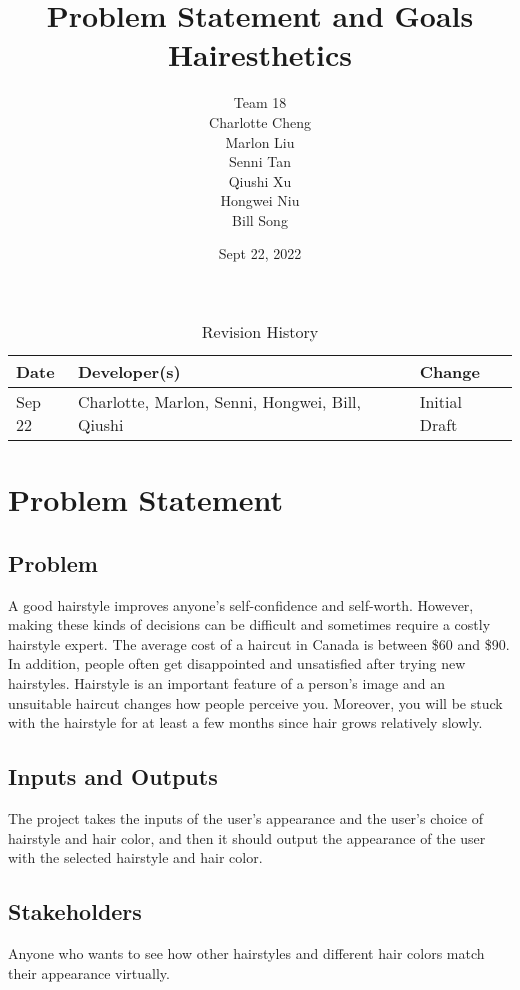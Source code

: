 \documentclass{article}
\title{Problem Statement and Goals\\Hairesthetics}
\author{Team 18 \\ Charlotte Cheng
        \\ Marlon Liu
        \\ Senni Tan
        \\ Qiushi Xu
        \\ Hongwei Niu
        \\ Bill Song
}
\date{Sept 22, 2022}
\begin{document}
\maketitle

\begin{table}[hp]
\caption{Revision History} \label{TblRevisionHistory}
\begin{tabularx}{\textwidth}{llX}
\toprule
\textbf{Date} & \textbf{Developer(s)} & \textbf{Change}\\
\midrule
Sep 22 & Charlotte, Marlon, Senni, Hongwei, Bill, Qiushi  & Initial Draft\\
\bottomrule
\end{tabularx}
\end{table}

\section{Problem Statement}

\subsection{Problem}

A good hairstyle improves anyone's self-confidence and self-worth. However, making these kinds of decisions can be difficult and sometimes require a costly hairstyle expert. The average cost of a haircut in Canada is between \$60 and \$90. In addition, people often get disappointed and unsatisfied after trying new hairstyles. Hairstyle is an important feature of a person's image and an unsuitable haircut changes how people perceive you. Moreover, you will be stuck with the hairstyle for at least a few months since hair grows relatively slowly. 


\subsection{Inputs and Outputs}

The project takes the inputs of the user's appearance and the user's choice of hairstyle and hair color, and then it should output the appearance of the user with the selected hairstyle and hair color.

\subsection{Stakeholders}

Anyone who wants to see how other hairstyles and different hair colors match their appearance virtually.
\end{document}
